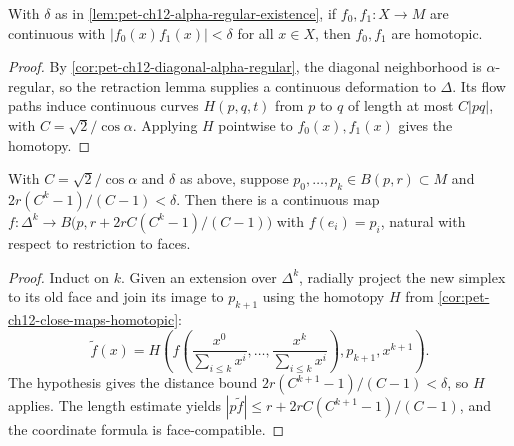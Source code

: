 \begin{corollary}
  \label{cor:pet-ch12-close-maps-homotopic}

  With $\delta$ as in \cref{lem:pet-ch12-alpha-regular-existence}, if
  $f_0,f_1:X\to M$ are continuous with $|f_0(x)f_1(x)|<\delta$ for all $x\in X$,
  then $f_0,f_1$ are homotopic.
\end{corollary}
\begin{proof}
  \sketch
  By \cref{cor:pet-ch12-diagonal-alpha-regular}, the diagonal neighborhood is
  \(\alpha\)-regular, so the retraction lemma
  supplies a continuous deformation to \(\Delta\). Its flow paths induce
  continuous curves \(H(p,q,t)\) from \(p\) to \(q\) of length at most
  \(C|pq|\), with \(C=\sqrt2/\cos\alpha\). Applying \(H\) pointwise to
  \(f_0(x),f_1(x)\) gives the homotopy.
\end{proof}

\begin{lemma}
  \label{lem:pet-ch12-simplex-extension}

  With $C=\sqrt2/\cos\alpha$ and $\delta$ as above, suppose
  $p_0,\dots,p_k\in B(p,r)\subset M$ and $2r(C^k-1)/(C-1)<\delta$. Then there is
  a continuous map $f:\Delta^k\to B\big(p,r+2rC(C^k-1)/(C-1)\big)$ with
  $f(e_i)=p_i$, natural with respect to restriction to faces.
\end{lemma}
\begin{proof}
  \sketch
  Induct on \(k\). Given an extension over \(\Delta^k\), radially project the
  new simplex to its old face and join its image to \(p_{k+1}\) using the
  homotopy \(H\) from \cref{cor:pet-ch12-close-maps-homotopic}:
  \[\widetilde f(x)=H\left(f\left(\frac{x^0}{\sum_{i\le k}x^i},\ldots,
      \frac{x^k}{\sum_{i\le k}x^i}\right),p_{k+1},x^{k+1}\right).\]
  The hypothesis gives the distance bound \(2r(C^{k+1}-1)/(C-1)<\delta\),
  so \(H\) applies. The length estimate yields
  \( |p\widetilde f|\le r+2rC(C^{k+1}-1)/(C-1)\), and the coordinate
  formula is face-compatible.
\end{proof}

